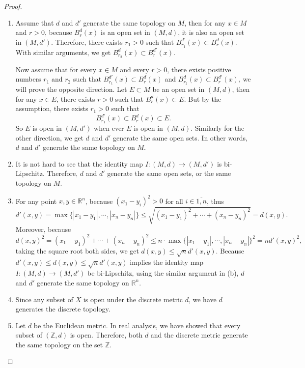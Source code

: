 \documentclass[12pt, a4paper]{article}
\theoremstyle{plain}
\newcommand{\R}{\mathbb{R}}
\newcommand{\Z}{\mathbb{Z}}
\begin{document}
	\begin{proof}
	\begin{enumerate}[label=(\alph*)]
	\item Assume that $d$ and $d'$ generate the same topology on $M$, then for any $x\in M$ and $r>0$, because $B_r^d(x)$ is an open set in $(M,d)$, it is also an open set in $(M,d')$. Therefore, there exists $r_1>0$ such that $B_{r_1}^{d'}(x)\subset B_r^d(x)$. With similar arguments, we get $B_{r_2}^d(x)\subset B_r^{d'}(x)$.
	
	Now assume that for every $x\in M$ and every $r>0$, there exists positive numbers $r_1$ and $r_2$ such that $B_{r_1}^{d'}(x)\subset B_r^d(x)$ and $B_{r_2}^d(x)\subset B_r^{d'}(x)$, we will prove the opposite direction. Let $E\subset M$ be an open set in $(M,d)$, then for any $x\in E$, there exists $r>0$ such that $B_r^d(x)\subset E$. But by the assumption, there exists $r_1>0$ such that
	\[
	B_{r_1}^{d'}(x)\subset B_r^d(x)\subset E.
	\]
	So $E$ is open in $(M,d')$ when ever $E$ is open in $(M,d)$. Similarly for the other direction, we get $d$ and $d'$ generate the same open sets. In other words, $d$ and $d'$ generate the same topology on $M$.
	\item It is not hard to see that the identity map $I:(M,d)\rightarrow (M,d')$ is bi-Lipschitz. Therefore, $d$ and $d'$ generate the same open sets, or the same topology on $M$.
	\item For any point $x,y\in \R^n$, because $(x_1-y_i)^2>0$ for all $i\in\overline{1,n}$, thus
	\[
	d'(x,y)=\max\{|x_1-y_1|,\cdots,|x_n-y_n|\}\leq \sqrt{(x_1-y_1)^2+\cdots +(x_n-y_n)^2}=d(x,y).
	\]
	Moreover, because
	\[
	d(x,y)^2=(x_1-y_1)^2+\cdots +(x_n-y_n)^2\leq n\cdot \max\{|x_1-y_1|,\cdots,|x_n-y_n|\}^2=nd'(x,y)^2,
	\]
	taking the square root both sides, we get $d(x,y)\leq \sqrt{n}d'(x,y)$. Because $d'(x,y)\leq d(x,y)\leq \sqrt{n}d'(x,y)$ implies the identity map $I:(M,d)\rightarrow (M,d')$ be bi-Lipschitz, using the similar argument in (b), $d$ and $d'$ generate the same topology on $\R^n$.
	\item Since any subset of $X$ is open under the discrete metric $d$, we have $d$ generates the discrete topology.
	\item Let $d$ be the Euclidean metric. In real analysis, we have showed that every subset of $(\Z,d)$ is open. Therefore, both $d$ and the discrete metric generate the same topology on the set $\Z$.
	\end{enumerate}
	\end{proof}
\end{document}
